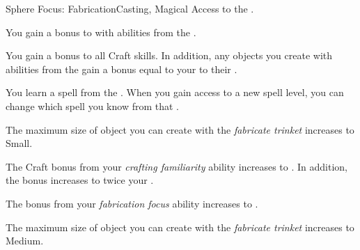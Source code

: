     \begin{feat}{Sphere Focus: Fabrication}{Casting, Magical}
        \featpre Access to the  .

         You gain a  bonus to  with abilities from the  .

         You gain a  bonus to all Craft skills.
        In addition, any objects you create with abilities from the   gain a bonus equal to your  to their .

         You learn a spell from the  .
        When you gain access to a new spell level, you can change which spell you know from that .

         The maximum size of object you can create with the \textit{fabricate trinket}  increases to Small.

         The Craft bonus from your \textit{crafting familiarity} ability increases to .
        In addition, the  bonus increases to twice your .

         The bonus from your \textit{fabrication focus} ability increases to .

         The maximum size of object you can create with the \textit{fabricate trinket}  increases to Medium.
    \end{feat}

